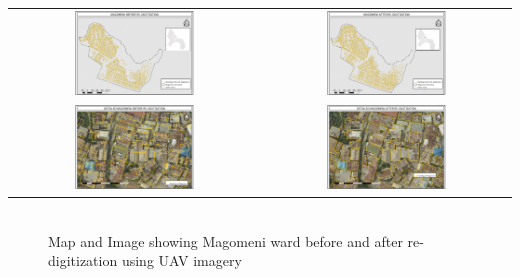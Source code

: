 \documentclass[a4paper,12pt,twoside]{article}
\begin{document}
\begin{tabular}{|c@{}c|}
  \hline
 
 \includegraphics[width=0.5\textwidth]{images/Magomeni_Before_Redigitization.png}&%
    \includegraphics[width=0.5\textwidth]{images/Magomeni_After_Redigitization.png}\\
 \includegraphics[width=0.5\textwidth]{images/Detailed_Magomeni_Before_Redigitization.png}&%
    \includegraphics[width=0.5\textwidth]{images/Detailed_Magomeni_After_Redigitization.png}\\
  \hline
\end{tabular}
\begin{figure}[h]
	\caption{Map and Image showing Magomeni ward before and after re-digitization using UAV imagery}
	\centering
	\includegraphics[width=0\textwidth]{images/Building_Footprint_Digitization.png}
\end{figure}
\end{document}

